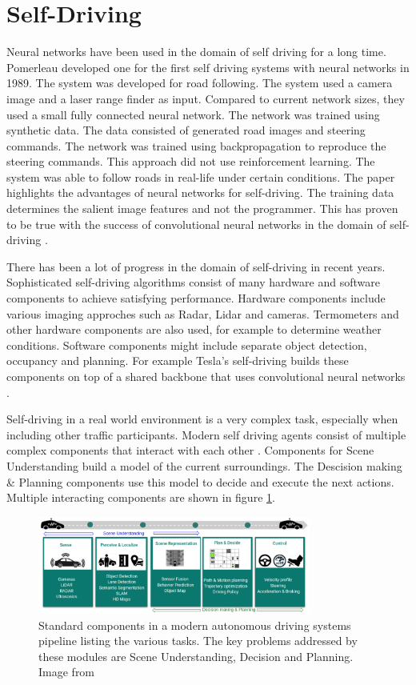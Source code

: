 \section{Self-Driving}

Neural networks have been used in the domain of self driving for a long time. Pomerleau \textcite{alvinn} developed one for the first self driving systems with neural networks in 1989. The system was developed for road following. The system used a camera image and a laser range finder as input. Compared to current network sizes, they used a small fully connected neural network. The network was trained using synthetic data. The data consisted of generated road images and steering commands. The network was trained using backpropagation to reproduce the steering commands. This approach did not use reinforcement learning. The system was able to follow roads in real-life under certain conditions.
The paper highlights the advantages of neural networks for self-driving. The training data determines the salient image features and not the programmer. This has proven to be true with the success of convolutional neural networks in the domain of self-driving \textcite{neptune}.


There has been a lot of progress in the domain of self-driving in recent years. Sophisticated self-driving algorithms consist of many hardware and software components to achieve satisfying performance. Hardware components include various imaging approches such as Radar, Lidar and cameras. Termometers and other hardware components are also used, for example to determine weather conditions. 
Software components might include separate object detection, occupancy and planning. For example Tesla's self-driving builds these components on top of a shared backbone that uses convolutional neural networks \textcite{howteslaautopilot}.

Self-driving in a real world environment is a very complex task, especially when including other traffic participants. Modern self driving agents consist of multiple complex components that interact with each other \textcite{drl_for_ad}. Components for Scene Understanding build a model of the current surroundings. The Descision making \& Planning components use this model to decide and execute the next actions.
Multiple interacting components are shown in figure \ref{fig:ad_components}.

\begin{figure}
    \centering
    \includegraphics[width=0.8\textwidth]{Bilder/ad_components_from_paper_drl_for_ad.png}
    \caption{Standard components in a modern autonomous driving systems pipeline listing the various tasks. The key problems addressed by these modules are Scene Understanding, Decision and Planning. Image from \textcite{drl_for_ad}}
    \label{fig:ad_components}
\end{figure}

